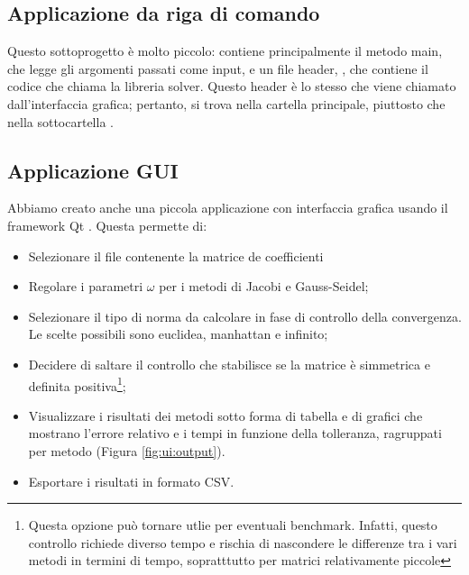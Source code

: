 \subsection{Applicazione da riga di comando}
Questo sottoprogetto è molto piccolo: contiene principalmente il metodo main, che legge gli argomenti passati come input, e un file header, , che contiene il codice che chiama la libreria solver. Questo header è lo stesso che viene chiamato dall'interfaccia grafica; pertanto, si trova nella cartella principale, piuttosto che nella sottocartella .


\subsection{Applicazione GUI}
Abbiamo creato anche una piccola applicazione con interfaccia grafica usando il framework Qt \cite{Qt}. Questa permette di:
\begin{itemize}
	\item Selezionare il file contenente la matrice de coefficienti
	\item Regolare i parametri $\omega$ per i metodi di Jacobi e Gauss-Seidel;
	\item Selezionare il tipo di norma da calcolare in fase di controllo della convergenza. Le scelte possibili sono euclidea, manhattan e infinito;
	\item Decidere di saltare il controllo che stabilisce se la matrice è simmetrica e definita positiva\footnote{Questa opzione può tornare utlie per eventuali benchmark. Infatti, questo controllo richiede diverso tempo e rischia di nascondere le differenze tra i vari metodi in termini di tempo, sopratttutto per matrici relativamente piccole};
	\item Visualizzare i risultati dei metodi sotto forma di tabella e di grafici che mostrano l'errore relativo e i tempi in funzione della tolleranza, ragruppati per metodo (Figura \ref{fig:ui:output}).
	\item Esportare i risultati in formato CSV.
\end{itemize}

